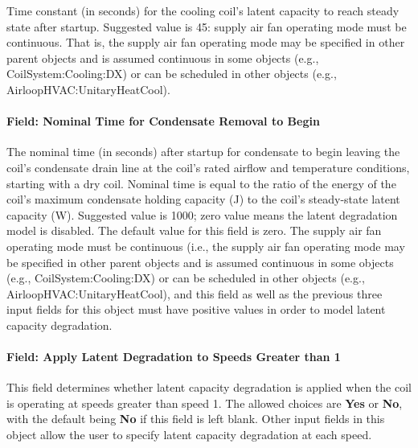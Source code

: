 Time constant (in seconds) for the cooling coil's latent capacity to reach steady state after startup. Suggested value is 45: supply air fan operating mode must be continuous. That is, the supply air fan operating mode may be specified in other parent objects and is assumed continuous in some objects (e.g., CoilSystem:Cooling:DX) or can be scheduled in other objects (e.g., AirloopHVAC:UnitaryHeatCool).

\paragraph{Field: Nominal Time for Condensate Removal to Begin}

The nominal time (in seconds) after startup for condensate to begin leaving the coil's condensate drain line at the coil's rated airflow and temperature conditions, starting with a dry coil. Nominal time is equal to the ratio of the energy of the coil's maximum condensate holding capacity (J) to the coil's steady-state latent capacity (W). Suggested value is 1000; zero value means the latent degradation model is disabled. The default value for this field is zero. The supply air fan operating mode must be continuous (i.e., the supply air fan operating mode may be specified in other parent objects and is assumed continuous in some objects (e.g., CoilSystem:Cooling:DX) or can be scheduled in other objects (e.g., AirloopHVAC:UnitaryHeatCool), and this field as well as the previous three input fields for this object must have positive values in order to model latent capacity degradation.

\paragraph{Field: Apply Latent Degradation to Speeds Greater than 1}

This field determines whether latent capacity degradation is applied when the coil is operating at speeds greater than speed 1. The allowed choices are \textbf{Yes} or \textbf{No}, with the default being \textbf{No} if this field is left blank. Other input fields in this object allow the user to specify latent capacity degradation at each speed.


